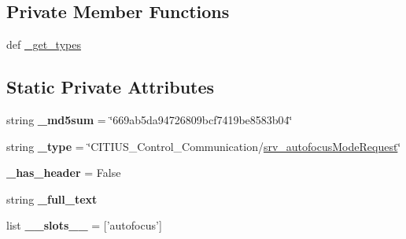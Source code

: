 \subsection*{\-Private \-Member \-Functions}
\begin{DoxyCompactItemize}
\item 
def \hyperlink{class_c_i_t_i_u_s___control___communication_1_1srv_1_1__srv__autofocus_mode_1_1srv__autofocus_mode_request_a7e7ba203226c6d7040b3184c64948879}{\-\_\-get\-\_\-types}
\end{DoxyCompactItemize}
\subsection*{\-Static \-Private \-Attributes}
\begin{DoxyCompactItemize}
\item 
\hypertarget{class_c_i_t_i_u_s___control___communication_1_1srv_1_1__srv__autofocus_mode_1_1srv__autofocus_mode_request_a8c75ab81af6d9c9075d398212e2b2a03}{string {\bfseries \-\_\-md5sum} = \char`\"{}669ab5da94726809bcf7419be8583b04\char`\"{}}\label{class_c_i_t_i_u_s___control___communication_1_1srv_1_1__srv__autofocus_mode_1_1srv__autofocus_mode_request_a8c75ab81af6d9c9075d398212e2b2a03}

\item 
\hypertarget{class_c_i_t_i_u_s___control___communication_1_1srv_1_1__srv__autofocus_mode_1_1srv__autofocus_mode_request_a773214f649e31d0f5d359368c1477957}{string {\bfseries \-\_\-type} = \char`\"{}\-C\-I\-T\-I\-U\-S\-\_\-\-Control\-\_\-\-Communication/\hyperlink{class_c_i_t_i_u_s___control___communication_1_1srv_1_1__srv__autofocus_mode_1_1srv__autofocus_mode_request}{srv\-\_\-autofocus\-Mode\-Request}\char`\"{}}\label{class_c_i_t_i_u_s___control___communication_1_1srv_1_1__srv__autofocus_mode_1_1srv__autofocus_mode_request_a773214f649e31d0f5d359368c1477957}

\item 
\hypertarget{class_c_i_t_i_u_s___control___communication_1_1srv_1_1__srv__autofocus_mode_1_1srv__autofocus_mode_request_a68208e9e1660dd6a39ffc0ade3c74956}{{\bfseries \-\_\-has\-\_\-header} = \-False}\label{class_c_i_t_i_u_s___control___communication_1_1srv_1_1__srv__autofocus_mode_1_1srv__autofocus_mode_request_a68208e9e1660dd6a39ffc0ade3c74956}

\item 
string {\bfseries \-\_\-full\-\_\-text}
\item 
\hypertarget{class_c_i_t_i_u_s___control___communication_1_1srv_1_1__srv__autofocus_mode_1_1srv__autofocus_mode_request_a9cd1c7317c88ec609cd548dd48b42019}{list {\bfseries \-\_\-\-\_\-slots\-\_\-\-\_\-} = \mbox{[}'autofocus'\mbox{]}}\label{class_c_i_t_i_u_s___control___communication_1_1srv_1_1__srv__autofocus_mode_1_1srv__autofocus_mode_request_a9cd1c7317c88ec609cd548dd48b42019}


\end{DoxyCompactItemize}
